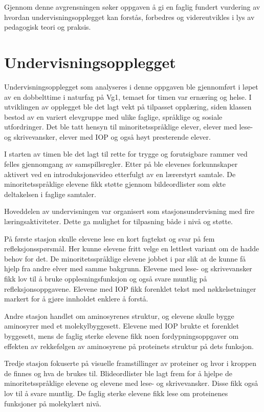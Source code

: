 \documentclass[a4paper,12pt]{article}
\begin{document}
Gjennom denne avgrensningen søker oppgaven å gi en faglig fundert vurdering av hvordan undervisningsopplegget kan forstås, forbedres og videreutvikles i lys av pedagogisk teori og praksis.

\section{Undervisningsopplegget}
Undervisningsopplegget som analyseres i denne oppgaven ble gjennomført i løpet av en dobbelttime i naturfag på Vg1, temaet for timen var ernæring og helse. I utviklingen av opplegget ble det lagt vekt på tilpasset opplæring, siden klassen bestod av en variert elevgruppe med ulike faglige, språklige og sosiale utfordringer. Det ble tatt hensyn til minoritetsspråklige elever, elever med lese- og skrivevansker, elever med IOP og også høyt presterende elever.

I starten av timen ble det lagt til rette for trygge og forutsigbare rammer ved felles gjennomgang av samspillsregler. Etter på ble elevenes forkunnskaper aktivert ved en introduksjonsvideo etterfulgt av en lærerstyrt samtale. De minoritetsspråklige elevene fikk støtte gjennom bildeordlister som økte deltakelsen i faglige samtaler.

Hoveddelen av undervisningen var organisert som stasjonsundervisning med fire læringsaktiviteter. Dette ga mulighet for tilpasning både i nivå og støtte.

På første stasjon skulle elevene lese en kort fagtekst og svar på fem refleksjonsspørsmål. Her kunne elevene fritt velge en lettlest variant om de hadde behov for det. De minoritetsspråklige elevene jobbet i par slik at de kunne få hjelp fra andre elver med samme bakgrunn. Elevene med lese- og skrivevansker fikk lov til å bruke opplesningsfunksjon og også svare muntlig på refleksjonsoppgavene. Elevene med IOP fikk forenklet tekst med nøkkelsetninger markert for å gjøre innholdet enklere å forstå.

Andre stasjon handlet om aminosyrenes struktur, og elevene skulle bygge aminosyrer med et molekylbyggesett. Elevene med IOP brukte et forenklet byggesett, mens de faglig sterke elevene fikk noen fordypningsoppgaver om effekten av rekkefølgen av aminosyrene på proteinets struktur på dets funksjon.

Tredje stasjon fokuserte på visuelle framstillinger av proteiner og hvor i kroppen de finnes og hva de brukes til. Blideordlister ble lagt frem for å hjelpe de minoritetsspråklige elevene og elevene med lese- og skrivevansker. Disse fikk også lov til å svare muntlig. De faglig sterke elevene fikk lese om proteinenes funksjoner på molekylært nivå.
\end{document}
